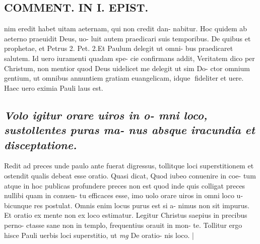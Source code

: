 \documentclass{article}
\begin{document}
\begin{pages}
\section*{COMMENT. IN I. EPIST. }\pstart nim eredit habet uitam aeternam, qui non credit dan- nabitur. Hoc quidem ab aeterno praeuidit Deus, uo- luit autem praedicari suis temporibus. De quibus et prophetae, et Petrus 2. Pet. 2.Et Paulum delegit ut omni- bus praedicaret salutem. Id uero iuramenti quadam spe- cie confirmans addit, Veritatem dico per Christum, non mentior quod Deus uidelicet me delegit ut sim Do- ctor omnium gentium, ut omnibus annuntiem gratiam euangelicam, idque fideliter et uere. Haec uero eximia Pauli laus est.  \pend
{}
{}
\subsection*{\textit{Volo igitur orare uiros in o- mni loco, sustollentes puras ma- nus absque iracundia et disceptatione. }}\pstart Redit ad preces unde paulo ante fuerat digressus, tollitque loci superstitionem et ostendit qualis debeat esse oratio. Quasi dicat, Quod iubeo conuenire in coe- tum atque in hoc publicas profundere preces non est quod inde quis colligat preces nullibi quam in conuen- tu efficaces esse, imo uolo orare uiros in omni loco u- bicunque res postulat. Omnis enim locus purus est si a- nimus non sit impurus. Et oratio ex mente non ex loco estimatur. Legitur Christus saepius in precibus perno- ctasse sane non in templo, frequentius orauit in mon- te. Tollitur ergo hisce Pauli uerbis loci superstitio, ut  \pend
\textit{mg}
\footnotesize De oratio- nis loco. 
\normalsize| 

\end{pages}
\end{document}
